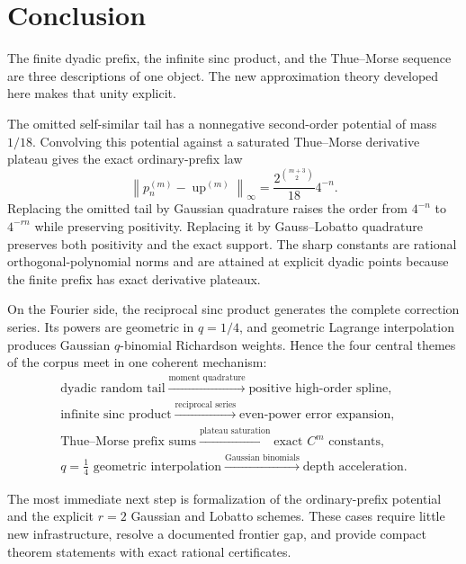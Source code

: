 \documentclass[11pt]{article}
\numberwithin{equation}{section}
\theoremstyle{definition}
\theoremstyle{remark}
\newcommand{\Up}{\operatorname{up}}
\newcommand{\norm}[1]{\left\lVert#1\right\rVert}
\begin{document}
\section{Conclusion}
\label{p1:sec:conclusion}

The finite dyadic prefix, the infinite sinc product, and the Thue--Morse sequence are three descriptions of one object.  The new approximation theory developed here makes that unity explicit.

The omitted self-similar tail has a nonnegative second-order potential of mass $1/18$.  Convolving this potential against a saturated Thue--Morse derivative plateau gives the exact ordinary-prefix law
\[
 \norm{p_n^{(m)}-\Up^{(m)}}_\infty
 =\frac{2^{\binom{m+3}{2}}}{18}4^{-n}.
\]
Replacing the omitted tail by Gaussian quadrature raises the order from $4^{-n}$ to $4^{-rn}$ while preserving positivity.  Replacing it by Gauss--Lobatto quadrature preserves both positivity and the exact support.  The sharp constants are rational orthogonal-polynomial norms and are attained at explicit dyadic points because the finite prefix has exact derivative plateaux.

On the Fourier side, the reciprocal sinc product generates the complete correction series.  Its powers are geometric in $q=1/4$, and geometric Lagrange interpolation produces Gaussian $q$-binomial Richardson weights.  Hence the four central themes of the corpus meet in one coherent mechanism:
\begin{equation}
 \boxed{
 \begin{gathered}
 \text{dyadic random tail}
 \xrightarrow{\text{moment quadrature}}
 \text{positive high-order spline},\\
 \text{infinite sinc product}
 \xrightarrow{\text{reciprocal series}}
 \text{even-power error expansion},\\
 \text{Thue--Morse prefix sums}
 \xrightarrow{\text{plateau saturation}}
 \text{exact }C^m\text{ constants},\\
 q=\tfrac14\text{ geometric interpolation}
 \xrightarrow{\text{Gaussian binomials}}
 \text{depth acceleration}.
 \end{gathered}}
 \label{p1:eq:four-way-summary}
\end{equation}

The most immediate next step is formalization of the ordinary-prefix potential and the explicit $r=2$ Gaussian and Lobatto schemes.  These cases require little new infrastructure, resolve a documented frontier gap, and provide compact theorem statements with exact rational certificates.
\end{document}
